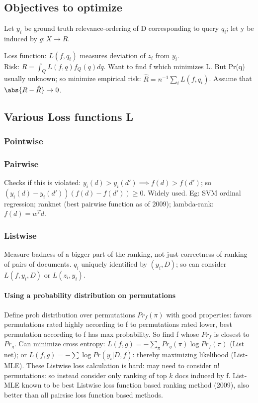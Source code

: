 \documentclass[oneside, article]{memoir}
\begin{document}
\subsection{Objectives to optimize}
Let $y_{i}$ be ground truth relevance-ordering of D corresponding to query $q_{i}$; let y be induced by $g:X \to R$.

Loss function: $L(f, q_{i})$ measures deviation of $z_{i}$ from $y_{i}$.\\
Risk: $R = \int_{Q}L(f,q) f_Q(q)dq$. Want to find f which minimizes L. But Pr(q) usually unknown; so minimize empirical risk: $\hat{R}=n^{-1} \sum_{i} L(f,q_{i})$. Assume that $\abs{R - \hat{R}} \to 0$.

\subsection{Various Loss functions L}
\subsubsection{Pointwise}
\tbc

\subsubsection{Pairwise}
Checks if this is violated: $y_{i}(d)>y_{i}(d') \implies f(d)>f(d')$; so $(y_{i}(d) - y_{i}(d'))(f(d) - f(d')) \geq 0$. Widely used. Eg: SVM ordinal regression; ranknet (best pairwise function as of 2009); lambda-rank: $f(d) = w^{T}d$.

\subsubsection{Listwise}
Measure badness of a bigger part of the ranking, not just correctness of ranking of pairs of documents. $q_{i}$ uniquely identified by $(y_{i}, D)$; so can consider $L(f, y_{i},D)$ or $L(z_{i}, y_{i})$.

\paragraph*{Using a probability distribution on permutations}
Define prob distribution over permutations $Pr_{f}(\pi)$ with good properties: favors permutations rated highly according to f to permutations rated lower, best permutation according to f has max probability. So find f whose $Pr_{f}$ is closest to $Pr_{g}$. Can minimize cross entropy: $L(f, g) = - \sum_{\pi} Pr_{g}(\pi) \log Pr_{f}(\pi)$ (List net); or $L(f, g) = - \sum \log Pr(y_{i}|D, f)$: thereby maximizing likelihood (List-MLE). These Listwise loss calculation is hard: may need to consider n! permutations: so instead consider only ranking of top $k$ docs induced by f. List-MLE known to be best Listwise loss function based ranking method (2009), also better than all pairsise loss function based methods.
\end{document}
